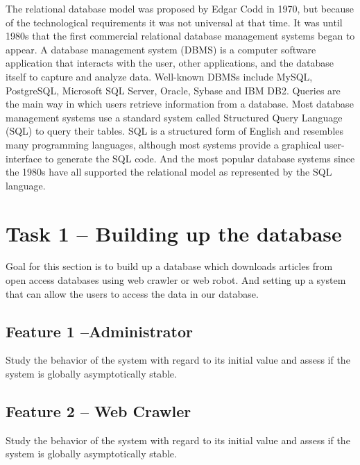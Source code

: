 \documentclass[a4paper]{article} %
\begin{document}
The relational database model was proposed by Edgar Codd in 1970, but because of the technological requirements it was not universal at that time. It was until 1980s that the first commercial relational database management systems began to appear. 
A database management system (DBMS) is a computer software application that interacts with the user, other applications, and the database itself to capture and analyze data. Well-known DBMSs include MySQL, PostgreSQL, Microsoft SQL Server, Oracle, Sybase and IBM DB2. 
Queries are the main way in which users retrieve information from a database. Most database management systems use a standard system called Structured Query Language (SQL) to query their tables. SQL is a structured form of English and resembles many programming languages, although most systems provide a graphical user-interface to generate the SQL code. And the most popular database systems since the 1980s have all supported the relational model as represented by the SQL language.




\section*{Task 1 -- Building up the database}
\label{task1}

Goal for this section is to build up a database which downloads articles from open access databases using web crawler or web robot. And setting up a system that can allow the users to access the data in our database.

\subsection*{Feature 1 --Administrator}
\label{task1:feature1}

Study the behavior of the system with regard to its initial value and assess if the system is globally asymptotically stable.

\subsection*{Feature 2 -- Web Crawler}
\label{task1:feature2}

Study the behavior of the system with regard to its initial value and assess if the system is globally asymptotically stable.
\end{document}
